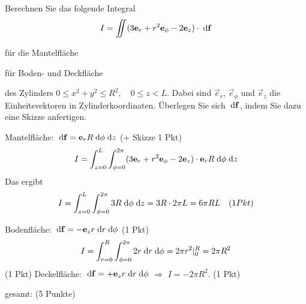 \begin{atiTask}[
  title = Skalarprodukte im Integranden
]

Berechnen Sie das folgende Integral
\[
I=\iint (3\mathbf{e}_r+r^2\mathbf{e}_\phi-2\mathbf{e}_z)\cdot \;\mathrm{d} \mathbf{f}
\]
\begin{atiSubtasks}
\item für die Mantelfläche
\item für Boden- und Deckfläche
\end{atiSubtasks}
des Zylinders $0\leq x^2+y^2\leq R^2, \quad 0\leq z<L$.
Dabei sind $\vec{e}_r$, $\vec{e}_\phi$ und $\vec{e}_z$ die Einheitsvektoren in Zylinderkoordinaten. Überlegen Sie sich $\;\mathrm{d}\mathbf{f}$, indem Sie dazu eine Skizze anfertigen. 
\end{atiTask}

\begin{atiSolution}
\begin{atiSubtasks} 
\item Mantelfläche: $\;\mathrm{d} \mathbf{f}=\mathbf{e}_rR\;\mathrm{d} \mathbf{\phi}\;\mathrm{d} z$ (+ Skizze 1 Pkt)
\[I=\int_{z=0}^L\int_{\phi=0}^{2\pi} (3\mathbf{e}_r+r^2\mathbf{e}_\phi-2\mathbf{e}_z)\cdot \mathbf{e}_r R\;\mathrm{d} \mathbf{\phi}\;\mathrm{d} z
\]
Das ergibt
\[I=\int_{z=0}^L\int_{\phi=0}^{2\pi}3R \;\mathrm{d} \phi\;\mathrm{d} z=3R\cdot 2\pi L=6\pi R L
\quad (1 Pkt)\]
\item Bodenfläche: $\;\mathrm{d} \mathbf{f}=-\mathbf{e}_z r\;\mathrm{d} r\;\mathrm{d} \mathbf{\phi}$ (1 Pkt)
\[I=\int_{r=0}^R\int_{\phi=0}^{2\pi} 2r\;\mathrm{d} r \;\mathrm{d} \phi = 2\pi r^2|_0^R=2\pi R^2
\]
(1 Pkt)
Deckelfläche: $\;\mathrm{d} \mathbf{f}=+\mathbf{e}_z r\;\mathrm{d} r\;\mathrm{d} \mathbf{\phi}$ $\Rightarrow$ $I=-2\pi R^2$. (1 Pkt)

gesamt: (5 Punkte)
\end{atiSubtasks}
\end{atiSolution}